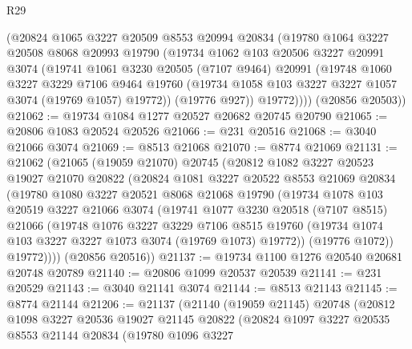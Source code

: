 \begin{lexlean}{R29}
\begin{coremodule}
        (@20824
          @1065
          @3227
          @20509
          @8553
          @20994
          @20834
          (@19780
            @1064
            @3227
            @20508
            @8068
            @20993
            @19790
            (@19734
              @1062
              @103
              @20506
              @3227
              @20991
              @3074
              (@19741
                @1061
                @3230
                @20505
                (@7107 @9464)
                @20991
                (@19748
                  @1060
                  @3227
                  @3229
                  @7106
                  @9464
                  @19760
                  (@19734 @1058 @103 @3227 @3227 @1057 @3074 (@19769 @1057) @19772))
                (@19776 @927))
              @19772))))
      (@20856 @20503))
@21062 := @19734 @1084 @1277 @20527 @20682 @20745 @20790
@21065 := @20806 @1083 @20524 @20526
@21066 := @231 @20516
@21068 := @3040 @21066 @3074
@21069 := @8513 @21068
@21070 := @8774 @21069
@21131 := @21062
    (@21065
      (@19059 @21070)
      @20745
      (@20812
        @1082
        @3227
        @20523
        @19027
        @21070
        @20822
        (@20824
          @1081
          @3227
          @20522
          @8553
          @21069
          @20834
          (@19780
            @1080
            @3227
            @20521
            @8068
            @21068
            @19790
            (@19734
              @1078
              @103
              @20519
              @3227
              @21066
              @3074
              (@19741
                @1077
                @3230
                @20518
                (@7107 @8515)
                @21066
                (@19748
                  @1076
                  @3227
                  @3229
                  @7106
                  @8515
                  @19760
                  (@19734 @1074 @103 @3227 @3227 @1073 @3074 (@19769 @1073) @19772))
                (@19776 @1072))
              @19772))))
      (@20856 @20516))
@21137 := @19734 @1100 @1276 @20540 @20681 @20748 @20789
@21140 := @20806 @1099 @20537 @20539
@21141 := @231 @20529
@21143 := @3040 @21141 @3074
@21144 := @8513 @21143
@21145 := @8774 @21144
@21206 := @21137
    (@21140
      (@19059 @21145)
      @20748
      (@20812
        @1098
        @3227
        @20536
        @19027
        @21145
        @20822
        (@20824
          @1097
          @3227
          @20535
          @8553
          @21144
          @20834
          (@19780
            @1096
            @3227

\end{coremodule}
\end{lexlean}
